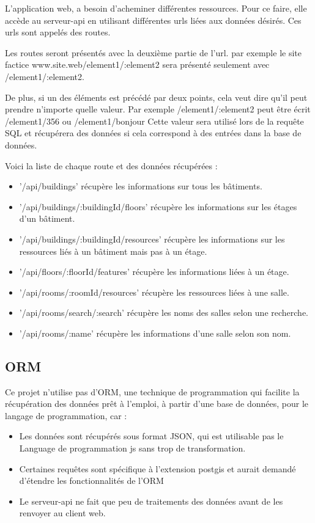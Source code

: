 \documentclass[
    iai, %
    il, %
]{heig-tb}
\begin{document}
L'application web, a besoin d'acheminer différentes ressources. Pour ce faire, elle accède au serveur-api en utilisant différentes urls liées aux données désirés.
Ces urls sont appelés des routes.

Les routes seront présentés avec la deuxième partie de l'url.
par exemple le site factice www.site.web/element1/:element2 sera présenté seulement avec /element1/:element2.

De plus, si un des éléments est précédé par deux points, cela veut dire qu'il peut prendre n'importe quelle valeur.
Par exemple /element1/:element2 peut être écrit /element1/356 ou /element1/bonjour
Cette valeur sera utilisé lors de la requête SQL et récupérera des données si cela correspond à des entrées dans la base de données.

Voici la liste de chaque route et des données récupérées :

\begin{itemize}
    \item '/api/buildings' récupère les informations sur tous les bâtiments.
    \item '/api/buildings/:buildingId/floors' récupère les informations sur les étages d'un bâtiment.
    \item '/api/buildings/:buildingId/resources' récupère les informations sur les ressources liés à un bâtiment mais pas à un étage.
    \item '/api/floors/:floorId/features' récupère les informations liées à un étage.
    \item '/api/rooms/:roomId/resources' récupère les ressources liées à une salle.
    \item '/api/rooms/search/:search' récupère les noms des salles selon une recherche.
    \item '/api/rooms/:name' récupère les informations d'une salle selon son nom.
\end{itemize}

\subsection{ORM}
Ce projet n'utilise pas d'ORM,
une technique de programmation qui facilite la récupération des données prêt à l'emploi, à partir d'une base de données, pour le langage de programmation,
car :

\begin{itemize}
    \item Les données sont récupérés sous format JSON, qui est utilisable pas le Language de programmation \gls{js} sans trop de transformation.
    \item Certaines requêtes sont spécifique à l'extension \gls{postgis} et aurait demandé d'étendre les fonctionnalités de l'ORM
    \item Le serveur-api ne fait que peu de traitements des données avant de les renvoyer au client web.
\end{itemize}
\end{document}
